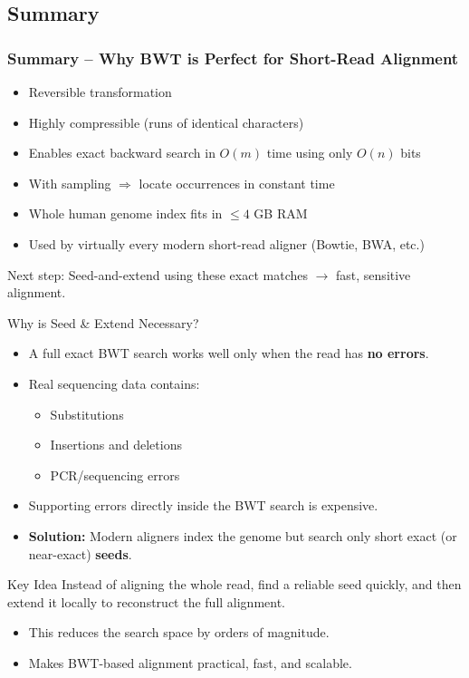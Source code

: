 \documentclass[
11pt, %
aspectratio=169, %
]{beamer}
\begin{document}
\subsection{Summary}

\begin{frame}
	\frametitle{Summary – Why BWT is Perfect for Short-Read Alignment}
	
	\begin{itemize}
		\item Reversible transformation
		\item Highly compressible (runs of identical characters)
		\item Enables \alert{exact} backward search in $O(m)$ time using only $O(n)$ bits
		\item With sampling $\Rightarrow$ locate occurrences in constant time
		\item Whole human genome index fits in \alert{$\leq 4$ GB} RAM
		\item Used by virtually every modern short-read aligner (Bowtie, BWA, etc.)
	\end{itemize}
	
	\bigskip
	\alert{Next step:} Seed-and-extend using these exact matches $\rightarrow$ fast, sensitive alignment.
\end{frame}


\begin{frame}{Why is Seed \& Extend Necessary?}
    \begin{itemize}
        \item A full exact BWT search works well only when the read has \textbf{no errors}.
        \item Real sequencing data contains:
        \begin{itemize}
            \item Substitutions
            \item Insertions and deletions
            \item PCR/sequencing errors
        \end{itemize}
        \item Supporting errors directly inside the BWT search is expensive.
        \item \textbf{Solution:} Modern aligners index the genome but search only short exact (or near-exact) \textbf{seeds}.
    \end{itemize}

    \begin{block}{Key Idea}
        Instead of aligning the whole read, find a reliable seed quickly,
        and then extend it locally to reconstruct the full alignment.
    \end{block}

    \begin{itemize}
        \item This reduces the search space by orders of magnitude.
        \item Makes BWT-based alignment practical, fast, and scalable.
    \end{itemize}
\end{frame}
\end{document}
